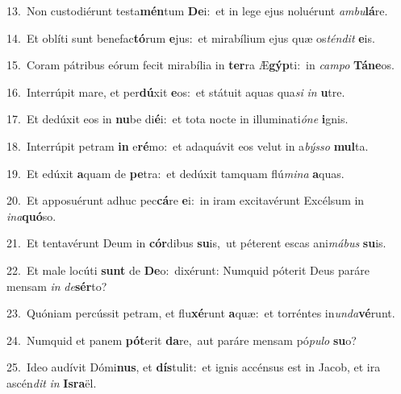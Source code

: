 {\numbfont\textcolor{\numbcolor}{13.}}~Non custodiérunt testa\-\textbf{mén}\-tum \textbf{De}\-i:~\star et in lege ejus noluérunt \textit{am}\-\textit{bu}\textbf{lá}re.\par
{\numbfont\textcolor{\numbcolor}{14.}}~Et oblíti sunt benefac\-\textbf{tó}\-rum \textbf{e}\-jus:~\star et mirabílium ejus quæ os\-\textit{tén}\-\textit{dit} \textbf{e}\-is.\par
{\numbfont\textcolor{\numbcolor}{15.}}~Coram pátribus eórum fecit mirabília in \textbf{ter}\-ra Æ\-\textbf{gýp}\-ti:~\star in \textit{cam}\-\textit{po} \textbf{Tá}\-\textbf{ne}os.\par
{\numbfont\textcolor{\numbcolor}{16.}}~Interrúpit mare, et per\-\textbf{dú}\-xit \textbf{e}\-os:~\star et státuit aquas qua\textit{si} \textit{in} \textbf{u}\-tre.\par
{\numbfont\textcolor{\numbcolor}{17.}}~Et dedúxit eos in \textbf{nu}\-be di\-\textbf{é}\-i:~\star et tota nocte in illuminati\-\textit{ó}\-\textit{ne} \textbf{i}\-gnis.\par
{\numbfont\textcolor{\numbcolor}{18.}}~Interrúpit petram \textbf{in} e\-\textbf{ré}\-mo:~\star et adaquávit eos velut in a\-\textit{býs}\-\textit{so} \textbf{mul}\-ta.\par
{\numbfont\textcolor{\numbcolor}{19.}}~Et edúxit \textbf{a}\-quam de \textbf{pe}\-tra:~\star et dedúxit tamquam flú\-\textit{mi}\-\textit{na} \textbf{a}\-quas.\par
{\numbfont\textcolor{\numbcolor}{20.}}~Et apposuérunt adhuc pec\-\textbf{cá}\-re \textbf{e}\-i:~\star in iram excitavérunt Excélsum in \textit{in}\-\textit{a}\textbf{quó}so.\par
{\numbfont\textcolor{\numbcolor}{21.}}~Et tentavérunt Deum in \textbf{cór}\-dibus \textbf{su}\-is,~\star ut péterent escas ani\-\textit{má}\-\textit{bus} \textbf{su}\-is.\par
{\numbfont\textcolor{\numbcolor}{22.}}~Et male locúti \textbf{sunt} de \textbf{De}\-o:~\star dixérunt: Numquid póterit Deus paráre mensam \textit{in} \textit{de}\-\textbf{sér}to?\par
{\numbfont\textcolor{\numbcolor}{23.}}~Quóniam percússit petram, et flu\-\textbf{xé}\-runt \textbf{a}\-quæ:~\star et torréntes in\-\textit{un}\-\textit{da}\textbf{vé}runt.\par
{\numbfont\textcolor{\numbcolor}{24.}}~Numquid et panem \textbf{pót}\-erit \textbf{da}\-re,~\star aut paráre mensam pó\-\textit{pu}\-\textit{lo} \textbf{su}\-o?\par
{\numbfont\textcolor{\numbcolor}{25.}}~Ideo audívit Dómi\-\textbf{nus}\-, et \textbf{dís}\-tulit:~\star et ignis accénsus est in Jacob, et ira ascén\textit{dit} \textit{in} \textbf{Is}\-\textbf{ra}ël.\par
